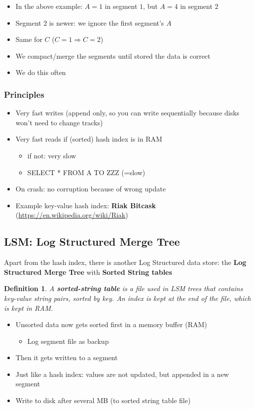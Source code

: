 \documentclass{article}
\newtheorem{theorem}{Definition}[section]
\begin{document}
\begin{itemize}
    \item In the above example: $A = 1$ in segment $1$, but $A = 4$ in segment $2$
    \item Segment $2$ is newer: we ignore the first segment's $A$
    \item Same for $C$ ($C=1 \Rightarrow C=2$)
    \item We compact/merge the segments until stored the data is correct
    \item We do this often
\end{itemize}

\subsubsection{Principles}

\begin{itemize}
    \item Very fast writes (append only, so you can write sequentially because disks won't need to change tracks)
    \item Very fast reads if (sorted) hash index is in RAM
    \begin{itemize}
        \item if not: very slow
        \item SELECT * FROM A TO ZZZ (=slow)
    \end{itemize}
    \item On crash: no corruption because of wrong update
    \item Example key-value hash index: \textbf{Riak Bitcask} (\url{https://en.wikipedia.org/wiki/Riak})
\end{itemize}

\subsection{LSM: Log Structured Merge Tree}

Apart from the hash index, there is another Log Structured data store: the \textbf{Log Structured Merge Tree} with \textbf{Sorted String tables}

\begin{theorem}
    A \textbf{sorted-string table} is a file used in LSM trees that contains key-value string pairs, sorted by key. 
    An index is kept at the end of the file, which is kept in RAM.
\end{theorem}

\begin{itemize}
    \item Unsorted data now gets sorted first in a memory buffer (RAM)
    \begin{itemize}
        \item Log segment file as backup
    \end{itemize}
    \item Then it gets written to a segment
    \item Just like a hash index: values are not updated, but appended in a new segment
    \item Write to disk after several MB (to sorted string table file)
\end{itemize}
\end{document}
